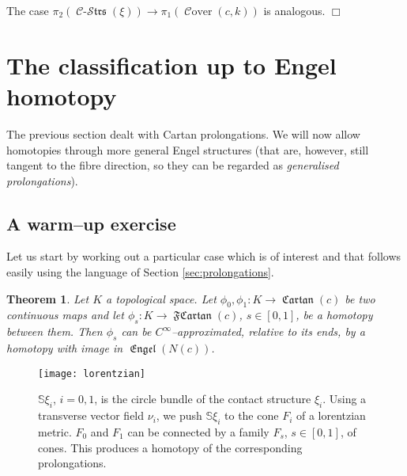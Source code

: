 \documentclass[10pt]{amsart}
\newcommand{\Cover}{\operatorname{\mathcal{C}over}}
\newcommand{\Engel}{\operatorname{\mathfrak{Engel}}}
\newcommand{\Cartan}{\operatorname{\mathfrak{Cartan}}}
\newcommand{\FCartan}{\operatorname{\mathfrak{FCartan}}}
\newcommand{\Cont}{\operatorname{\mathcal{C}-\mathcal{S}\mathfrak{trs}}}
\newcommand{\NS}{{\mathbb{S}}}
\newtheorem{theorem}{Theorem}
\theoremstyle{definition}
\begin{document}
The case $\pi_2(\Cont(\xi)) \to \pi_1(\Cover(c,k))$ is analogous. \hfill $\Box$








\section{The classification up to Engel homotopy} \label{sec:Engel}

The previous section dealt with Cartan prolongations. We will now allow homotopies through more general Engel structures (that are, however, still tangent to the fibre direction, so they can be regarded as \emph{generalised prolongations}). 

\subsection{A warm--up exercise} \label{ssec:exercise}

Let us start by working out a particular case which is of interest and that follows easily using the language of Section \ref{sec:prolongations}.

\begin{theorem} \label{thm:exercise}
Let $K$ a topological space. Let $\phi_0, \phi_1: K \to \Cartan(c)$ be two continuous maps and let $\phi_s: K \to \FCartan(c)$, $s \in [0,1]$, be a homotopy between them. Then $\phi_s$ can be $C^\infty$--approximated, relative to its ends, by a homotopy with image in $\Engel(N(c))$.
\end{theorem}



\begin{figure}[ht] 
\centering
\texttt{[image: lorentzian]}
\caption{$\NS\xi_i$, $i=0,1$, is the circle bundle of the contact structure $\xi_i$. Using a transverse vector field $\nu_i$, we push $\NS\xi_i$ to the cone $F_i$ of a lorentzian metric. $F_0$ and $F_1$ can be connected by a family $F_s$, $s\in [0,1]$, of cones. This produces a homotopy of the corresponding prolongations.}
\label{fig:lorentzian}
\end{figure}
\end{document}
